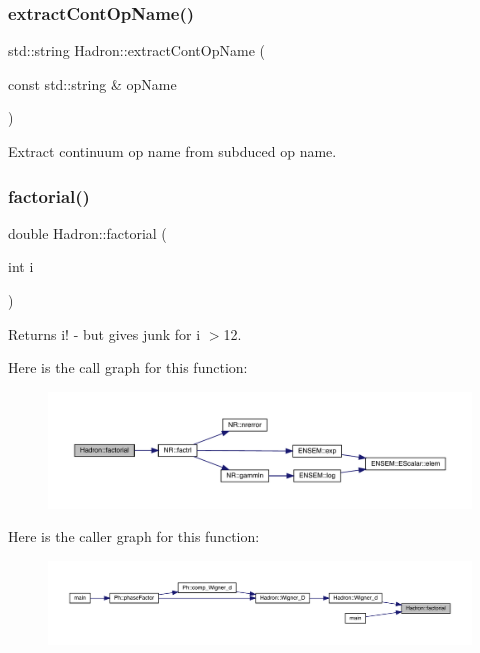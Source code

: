 \subsubsection{\texorpdfstring{extractContOpName()}{extractContOpName()}}
{\footnotesize\ttfamily std\+::string Hadron\+::extract\+Cont\+Op\+Name (\begin{DoxyParamCaption}\item[{const std\+::string \&}]{op\+Name }\end{DoxyParamCaption})}



Extract continuum op name from subduced op name. 

\mbox{\label{namespaceHadron_a0df3fb454ec05867e44777d4f5a6b7f7}} 
\subsubsection{\texorpdfstring{factorial()}{factorial()}}
{\footnotesize\ttfamily double Hadron\+::factorial (\begin{DoxyParamCaption}\item[{int}]{i }\end{DoxyParamCaption})\hspace{0.3cm}{\ttfamily [inline]}}



Returns i! -\/ but gives junk for i $>$12. 

Here is the call graph for this function\+:\nopagebreak
\begin{figure}[H]
\begin{center}
\leavevmode
\includegraphics[width=350pt]{d1/daf/namespaceHadron_a0df3fb454ec05867e44777d4f5a6b7f7_cgraph}
\end{center}
\end{figure}
Here is the caller graph for this function\+:
\nopagebreak
\begin{figure}[H]
\begin{center}
\leavevmode
\includegraphics[width=350pt]{d1/daf/namespaceHadron_a0df3fb454ec05867e44777d4f5a6b7f7_icgraph}
\end{center}
\end{figure}
\mbox{\label{namespaceHadron_aa258f26ea52528eac314f32a02bf8ac3}} 
